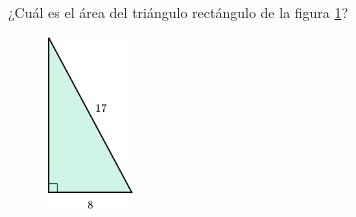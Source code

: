 ¿Cuál es el área del triángulo rectángulo de la figura \ref{fig:area_rectangulo_02}?
\begin{figure}[H]
    \begin{center}
        \includegraphics[width=0.2\textwidth]{../images/area_rectangulo_02}
    \end{center}
    \caption{}
    \label{fig:area_rectangulo_02}
\end{figure}